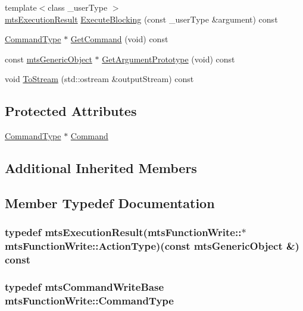 \begin{DoxyCompactItemize}
\item 
{\footnotesize template$<$class \-\_\-user\-Type $>$ }\\\hyperlink{classmts_execution_result}{mts\-Execution\-Result} \hyperlink{classmts_function_write_a6485d6f43ce827afed11a155c43dbeef}{Execute\-Blocking} (const \-\_\-user\-Type \&argument) const 
\item 
\hyperlink{classmts_function_write_a4b81286be87adec18b358ebaa9ebb2be}{Command\-Type} $\ast$ \hyperlink{classmts_function_write_ad8f4d561ea927be81b0bfe73f1d360eb}{Get\-Command} (void) const 
\item 
const \hyperlink{classmts_generic_object}{mts\-Generic\-Object} $\ast$ \hyperlink{classmts_function_write_ab3d6c6e2a28441d5cf0eb2ecd6ff8140}{Get\-Argument\-Prototype} (void) const 
\item 
void \hyperlink{classmts_function_write_a3e7e0298146311a8adae45c0441891b7}{To\-Stream} (std\-::ostream \&output\-Stream) const 
\end{DoxyCompactItemize}
\subsection*{Protected Attributes}
\begin{DoxyCompactItemize}
\item 
\hyperlink{classmts_function_write_a4b81286be87adec18b358ebaa9ebb2be}{Command\-Type} $\ast$ \hyperlink{classmts_function_write_ac457eca9ee4e0f8bfc4b2c8a9b3a7927}{Command}
\end{DoxyCompactItemize}
\subsection*{Additional Inherited Members}


\subsection{Member Typedef Documentation}
\hypertarget{classmts_function_write_ae04f4fc0dcdb45574b7b1e978cc7c31b}{
\subsubsection[{Action\-Type}]{\setlength{\rightskip}{0pt plus 5cm}typedef {\bf mts\-Execution\-Result}(mts\-Function\-Write\-::$\ast$ mts\-Function\-Write\-::\-Action\-Type)(const {\bf mts\-Generic\-Object} \&) const }}\label{classmts_function_write_ae04f4fc0dcdb45574b7b1e978cc7c31b}
\hypertarget{classmts_function_write_a4b81286be87adec18b358ebaa9ebb2be}{
\subsubsection[{Command\-Type}]{\setlength{\rightskip}{0pt plus 5cm}typedef {\bf mts\-Command\-Write\-Base} {\bf mts\-Function\-Write\-::\-Command\-Type}}}\label{classmts_function_write_a4b81286be87adec18b358ebaa9ebb2be}


